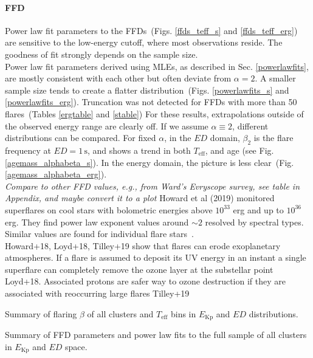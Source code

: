 \documentclass{aa}
\begin{document}
\paragraph{FFD}
Power law fit parameters to the FFDs~(Figs. \ref{ffds_teff_s} and \ref{ffds_teff_erg}) are sensitive to the low-energy cutoff, where most observations reside. The goodness of fit strongly depends on the sample size.
\\
Power law fit parameters derived using MLEs, as described in Sec. \ref{powerlawfits}, are mostly consistent with each other but often deviate from $\alpha=2$. A smaller sample size tends to create a flatter distribution~(Figs. \ref{powerlawfits_s} and \ref{powerlawfits_erg}). Truncation was not detected for FFDs with more than 50 flares~(Tables \ref{ergtable} and \ref{stable}) For these results, extrapolations outside of the observed energy range are clearly off. If we assume $\alpha \equiv 2$,  different distributions can be compared. For fixed $\alpha$, in the $ED$ domain, $\beta_2$ is the flare frequency at $ED=1\,\mathrm{s}$, and shows a trend in both $T_\mathrm{eff}$, and age (see Fig. \ref{agemass_alphabeta_s}). In the energy domain, the picture is less clear~(Fig. \ref{agemass_alphabeta_erg}).
\\
\textit{Compare to other FFD values, e.g., from Ward's Evryscope survey, see table in Appendix, and maybe convert it to a plot}
Howard et al (2019) monitored superflares on cool stars with bolometric energies above $10^{33}$ erg and up to $10^{36}$erg. They find power law exponent values around $\sim 2$ resolved by spectral types. Similar values are found for individual flare stars~\citep{lurie_kepler_2015}.
\\
Howard+18, Loyd+18, Tilley+19 show that flares can erode exoplanetary atmospheres. If a flare is assumed to deposit its UV energy in an instant a single superflare can completely remove the ozone layer at the substellar point Loyd+18. Associated protons are safer way to ozone destruction if they are associated with reoccurring large flares Tilley+19
\begin{table}
\caption{Summary of flaring $\beta$ of all clusters and $T_\mathrm{eff}$ bins in $E_\mathrm{Kp}$ and $ED$ distributions.}\label{powerlawtable_spt}
\centering

\end{table}
\begin{table}
\caption{Summary of FFD parameters and power law fits to the full sample of all clusters in $E_\mathrm{Kp}$ and $ED$ space.}\label{powerlawtable_fullsample}
\centering

\end{table}
\end{document}
